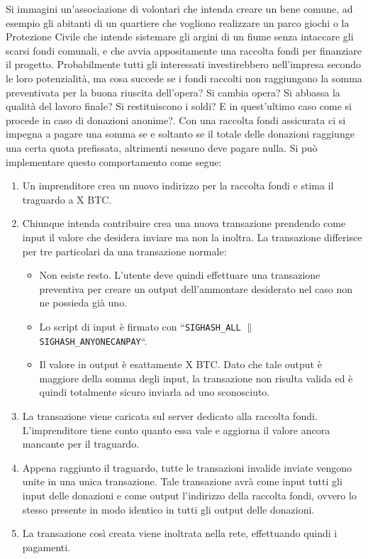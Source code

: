 Si immagini un'associazione di volontari che intenda creare un bene comune, ad esempio gli abitanti di un quartiere che vogliono realizzare un parco giochi o la Protezione Civile che intende sistemare gli argini di un fiume senza intaccare gli scarsi fondi comunali, e che avvia appositamente una raccolta fondi per finanziare il progetto. Probabilmente tutti gli interessati investirebbero nell'impresa secondo le loro potenzialità, ma cosa succede se i fondi raccolti non raggiungono la somma preventivata per la buona riuscita dell'opera? Si cambia opera? Si abbassa la qualità del lavoro finale? Si restituiscono i soldi? E in quest'ultimo caso come si procede in caso di donazioni anonime?.
Con una raccolta fondi assicurata ci si impegna a pagare una somma se e soltanto se il totale delle donazioni raggiunge una certa quota prefissata, altrimenti nessuno deve pagare nulla.
Si può implementare questo comportamento come segue:
\begin{enumerate}
    \item Un imprenditore crea un nuovo indirizzo per la raccolta fondi e stima il traguardo a X BTC.
    \item Chiunque intenda contribuire crea una nuova transazione prendendo come input il valore che desidera inviare ma non la inoltra. La transazione differisce per tre particolari da una transazione normale: \begin{itemize}
        \item Non esiste resto. L'utente deve quindi effettuare una transazione preventiva per creare un output dell'ammontare desiderato nel caso non ne possieda già uno.
        \item Lo script di input è firmato con ``\verb|SIGHASH_ALL| $\|$ \verb|SIGHASH_ANYONECANPAY|``.
        \item Il valore in output è esattamente X BTC. Dato che tale output è maggiore della somma degli input, la transazione non risulta valida ed è quindi totalmente sicuro inviarla ad uno sconosciuto.
    \end{itemize}
    \item La transazione viene caricata sul server dedicato alla raccolta fondi. L'imprenditore tiene conto quanto essa vale e aggiorna il valore ancora mancante per il traguardo.
    \item Appena raggiunto il traguardo, tutte le transazioni invalide inviate vengono unite in una unica transazione. Tale transazione avrà come input tutti gli input delle donazioni e come output l'indirizzo della raccolta fondi, ovvero lo stesso presente in modo identico in tutti gli output delle donazioni.
    \item La transazione così creata viene inoltrata nella rete, effettuando quindi i pagamenti.
\end{enumerate}
